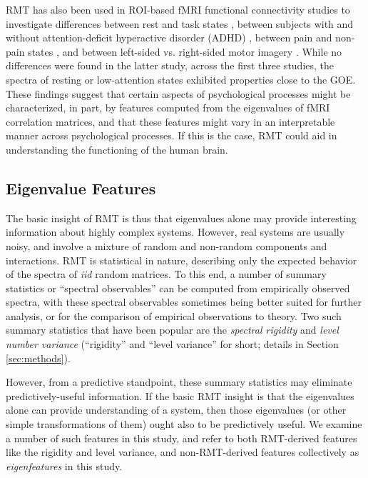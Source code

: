 \documentclass[12pt]{spieman}  %
\begin{document}
\begin{spacing}{2}
RMT has also been used in ROI-based fMRI functional connectivity studies to
investigate differences between rest and task states
\cite{wangSpectralPropertiesTemporal2015}, between subjects with and without
attention-deficit hyperactive disorder (ADHD)
\cite{wangRandomMatrixTheory2016}, between pain and non-pain states
\cite{matharooSpontaneousBackpainAlters2020}, and between left-sided vs.
right-sided motor imagery \cite{guRandomMatrixTheory2020}. While no differences
were found in the latter study, across the first three studies, the spectra of
resting or low-attention states exhibited properties close to the GOE. These
findings suggest that certain aspects of psychological processes might be
characterized, in part, by features computed from the eigenvalues of fMRI
correlation matrices, and that these features might vary in an interpretable
manner across psychological processes. If this is the case, RMT could aid in
understanding the functioning of the human brain.


\subsection{Eigenvalue Features}

The basic insight of RMT is thus that eigenvalues alone may provide
interesting information about highly complex systems. However, real systems are
usually noisy, and involve a mixture of random and non-random components and
interactions. RMT is statistical in nature, describing only the expected
behavior of the spectra of \textit{iid} random matrices. To this end, a number
of summary statistics or ``spectral observables''
\cite{mehtaRandomMatrices2004, guhrRandommatrixTheoriesQuantum1998a} can be
computed from empirically observed spectra, with these spectral observables
sometimes being better suited for further analysis, or for the comparison of
empirical observations to theory. Two such summary statistics that have been
popular\cite{santhanamStatisticsAtmosphericCorrelations2001,
jalanUncoveringRandomnessSuccess2014, matharooSpontaneousBackpainAlters2020,
bandyopadhyayUniversalityComplexNetworks2007,
agrawalQuantifyingRandomnessProtein2014, raiRandomnessPreservedPatterns2015,
sebaRandomMatrixAnalysis2003,wangSpectralPropertiesTemporal2015,
wangRandomMatrixTheory2016} are the \textit{spectral rigidity} and
\textit{level number variance} (``rigidity'' and ``level variance'' for short;
details in Section \ref{sec:methods}).

However, from a predictive standpoint, these summary statistics may eliminate
predictively-useful information. If the basic RMT insight is that the
eigenvalues alone can provide understanding of a system, then those eigenvalues
(or other simple transformations of them) ought also to be predictively useful.
We examine a number of such features in this study, and refer to both
RMT-derived features like the rigidity and level variance, and non-RMT-derived
features collectively as \textit{eigenfeatures} in this study.


\end{spacing}
\end{document}

